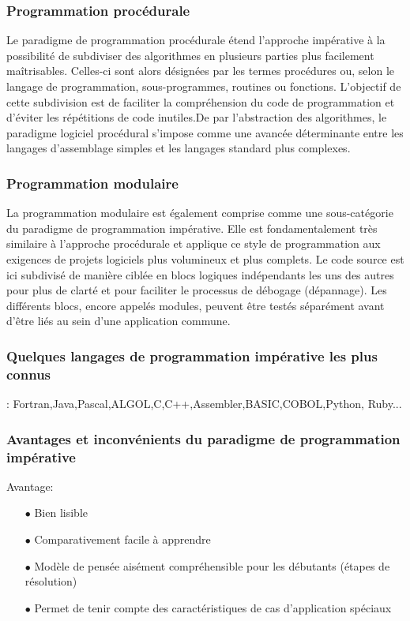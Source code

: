 \documentclass[a4paper,12pt]{article} %
\begin{document}
\subsubsection{Programmation procédurale}

Le paradigme de programmation procédurale étend l’approche impérative à la possibilité de subdiviser des algorithmes en plusieurs parties plus facilement maîtrisables. Celles-ci sont alors désignées par les termes procédures ou, selon le langage de programmation, sous-programmes, routines ou fonctions. L’objectif de cette subdivision est de faciliter la compréhension du code de programmation et d’éviter les répétitions de code inutiles.De par l’abstraction des algorithmes, le paradigme logiciel procédural s’impose comme une avancée déterminante entre les langages d’assemblage simples et les langages standard plus complexes.

\subsubsection{Programmation modulaire}

La programmation modulaire est également comprise comme une sous-catégorie du paradigme de programmation impérative. Elle est fondamentalement très similaire à l’approche procédurale et applique ce style de programmation aux exigences de projets logiciels plus volumineux et plus complets. Le code source est ici subdivisé de manière ciblée en blocs logiques indépendants les uns des autres pour plus de clarté et pour faciliter le processus de débogage (dépannage). Les différents blocs, encore appelés modules, peuvent être testés séparément avant d’être liés au sein d’une application commune.

\subsubsection{Quelques langages de programmation impérative les plus connus }: Fortran,Java,Pascal,ALGOL,C,C++,Assembler,BASIC,COBOL,Python,
Ruby...

\subsubsection{Avantages et inconvénients du paradigme de programmation impérative}

Avantage:
\begin{itemize}
   \item[$\bullet$]Bien lisible
   \item[$\bullet$]Comparativement facile à apprendre
   \item[$\bullet$]Modèle de pensée aisément compréhensible pour les débutants (étapes de résolution)
   \item[$\bullet$]Permet de tenir compte des caractéristiques de cas d’application spéciaux
\end{itemize}
\end{document}
